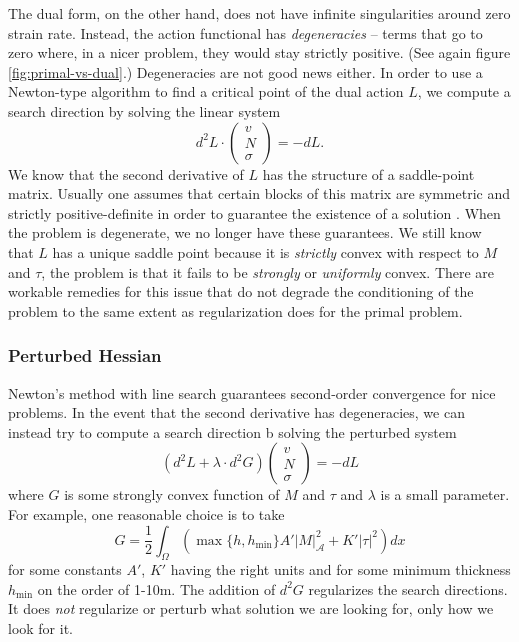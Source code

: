 \documentclass[twocolumn,letterpaper]{igs}
\begin{document}
The dual form, on the other hand, does not have infinite singularities around zero strain rate.
Instead, the action functional has \emph{degeneracies} -- terms that go to zero where, in a nicer problem, they would stay strictly positive.
(See again figure \ref{fig:primal-vs-dual}.)
Degeneracies are not good news either.
In order to use a Newton-type algorithm to find a critical point of the dual action $L$, we compute a search direction by solving the linear system
\begin{equation}
    d^2L\cdot\left(\begin{matrix} v \\ N \\ \sigma\end{matrix}\right) = -dL.
\end{equation}
We know that the second derivative of $L$ has the structure of a saddle-point matrix.
Usually one assumes that certain blocks of this matrix are symmetric and strictly positive-definite in order to guarantee the existence of a solution \citep{boffi2013mixed}.
When the problem is degenerate, we no longer have these guarantees.
We still know that $L$ has a unique saddle point because it is \emph{strictly} convex with respect to $M$ and $\tau$, the problem is that it fails to be \emph{strongly} or \emph{uniformly} convex.
There are workable remedies for this issue that do not degrade the conditioning of the problem to the same extent as regularization does for the primal problem.

\subsubsection{Perturbed Hessian}

Newton's method with line search guarantees second-order convergence for nice problems.
In the event that the second derivative has degeneracies, we can instead try to compute a search direction b solving the perturbed system
\begin{equation}
    \left(d^2L + \lambda\cdot d^2G\right)\left(\begin{matrix} v \\ N \\ \sigma\end{matrix}\right) = -dL
    \label{eq:regularized-newton-step}
\end{equation}
where $G$ is some strongly convex function of $M$ and $\tau$ and $\lambda$ is a small parameter.
For example, one reasonable choice is to take
\begin{equation}
    G = \frac{1}{2}\int_\Omega\left(\max\{h, h_{\text{min}}\}A'|M|_{\mathscr{A}}^2 + K'|\tau|^2\right)dx
\end{equation}
for some constants $A'$, $K'$ having the right units and for some minimum thickness $h_{\text{min}}$ on the order of 1-10m.
The addition of $d^2G$ regularizes the search directions.
It does \emph{not} regularize or perturb what solution we are looking for, only how we look for it.
\end{document}

